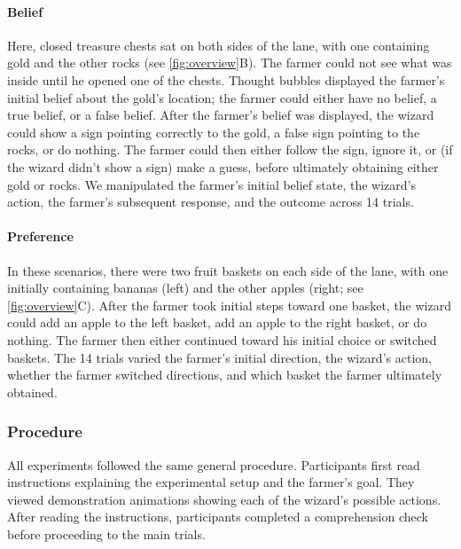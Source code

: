 \documentclass[10pt,letterpaper]{article}
\begin{document}
\paragraph{Belief}

Here, closed treasure chests sat on both sides of the lane, with one containing gold and the other rocks (see \autoref{fig:overview}B). 
The farmer could not see what was inside until he opened one of the chests.
Thought bubbles displayed the farmer's initial belief about the gold's location; the farmer could either have no belief, a true belief, or a false belief.
After the farmer's belief was displayed, the wizard could show a sign pointing correctly to the gold, a false sign pointing to the rocks, or do nothing.
The farmer could then either follow the sign, ignore it, or (if the wizard didn't show a sign) make a guess, before ultimately obtaining either gold or rocks.
We manipulated the farmer's initial belief state, the wizard's action, the farmer's subsequent response, and the outcome across 14 trials.


\paragraph{Preference}

In these scenarios, there were two fruit baskets on each side of the lane, with one initially containing bananas (left) and the other apples (right; see \autoref{fig:overview}C).
After the farmer took initial steps toward one basket, the wizard could add an apple to the left basket, add an apple to the right basket, or do nothing.
The farmer then either continued toward his initial choice or switched baskets.
The 14 trials varied the farmer's initial direction, the wizard's action, whether the farmer switched directions, and which basket the farmer ultimately obtained.


\subsubsection{Procedure}

All experiments followed the same general procedure. 
Participants first read instructions explaining the experimental setup and the farmer's goal. 
They viewed demonstration animations showing each of the wizard's possible actions. 
After reading the instructions, participants completed a comprehension check before proceeding to the main trials.

\end{document}
